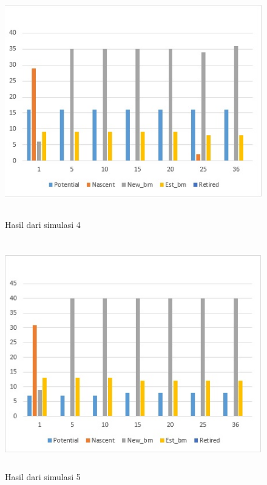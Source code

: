 	\begin{figure} [H]
	\centering  
	\includegraphics[width=12cm, height=10cm]{grafik4} 
		\caption[Hasil dari simulasi]{Hasil dari simulasi 4}
	\label{grafik4} 
\end{figure}

	\begin{figure} [H]
	\centering  
	\includegraphics[width=12cm, height=10cm]{grafik5} 
		\caption[Hasil dari simulasi]{Hasil dari simulasi 5}
	\label{grafik5} 
\end{figure}

